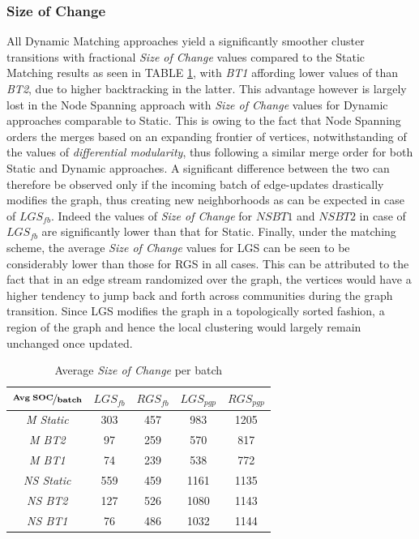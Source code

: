 \documentclass[conference]{IEEEtran}
\begin{document}
\subsubsection{Size of Change}
All Dynamic Matching approaches yield a significantly smoother cluster 
transitions with fractional \emph{Size of Change} values compared to the Static 
Matching results as seen in TABLE \ref{soct}, with \emph{BT1} affording lower 
values of than \emph{BT2}, due to higher backtracking in the latter. This 
advantage however is largely lost in the Node Spanning approach with \emph{Size 
of Change} values for Dynamic approaches comparable to Static. This is owing to 
the fact that Node Spanning orders the merges based on an expanding frontier of 
vertices, notwithstanding of the values of \emph{differential modularity}, thus 
following a similar merge order for both Static and Dynamic approaches. A 
significant difference between the two can therefore be observed only if the 
incoming batch of edge-updates drastically modifies the graph, thus creating new 
neighborhoods as can be expected in case of $LGS_{fb}$. Indeed the values of 
\emph{Size of Change} for $NS BT1$ and $NS BT2$ in case of $LGS_{fb}$ are 
significantly lower than that for Static. Finally, under the matching scheme, 
the average \emph{Size of Change} values for LGS can be seen to be considerably 
lower than those for RGS in all cases. This can be attributed to the fact that 
in an edge stream randomized over the graph, the vertices would have a higher 
tendency to jump back and forth across communities during the graph transition. 
Since LGS modifies the graph in a topologically sorted fashion, a region of the 
graph and hence the local clustering would largely remain unchanged once 
updated.
\begin{table}
\begin{center}
\begin{tabular}{|c|c|c|c|c|}\hline
$\mathbf{\nicefrac{\mathbf{Avg\; SOC}}{batch}}$ & \textit{$LGS_{fb}$} & 
\textit{$RGS_{fb}$} & \textit{$LGS_{pgp}$} & \textit{$RGS_{pgp}$}\\\hline
\textit{M Static} & 303 & 457 & 983 & 1205\\\hline
\textit{M BT2} & 97 & 259 & 570 & 817\\\hline
\textit{M BT1} & 74 & 239 & 538 & 772\\\hline
\textit{NS Static} & 559 & 459 & 1161 & 1135\\\hline
\textit{NS BT2} & 127 & 526 & 1080 & 1143\\\hline
\textit{NS BT1} & 76 & 486 & 1032 & 1144\\\hline
\end{tabular}
\vspace{-0.4cm}
\caption{\label{soct}Average \emph{Size of Change} per batch\vspace{-0.1cm}}
\end{center}
\end{table}
\end{document}
